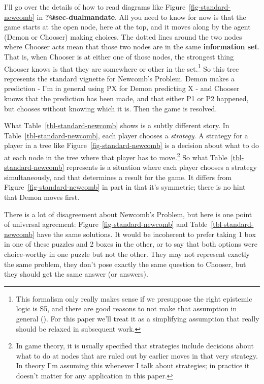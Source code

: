 \documentclass[
  10pt,
  letterpaper,
  DIV=11,
  numbers=noendperiod,
  twoside]{scrartcl}
\begin{document}
I'll go over the details of how to read diagrams like
Figure~\ref{fig-standard-newcomb} in \textbf{?@sec-dualmandate}. All you
need to know for now is that the game starts at the open node, here at
the top, and it moves along by the agent (Demon or Chooser) making
choices. The dotted lines around the two nodes where Chooser acts mean
that those two nodes are in the same \textbf{information set}. That is,
when Chooser is at either one of those nodes, the strongest thing
Chooser knows is that they are somewhere or other in the set.\footnote{This
  formalism only really makes sense if we presuppose the right epistemic
  logic is S5, and there are good reasons to not make that assumption in
  general ().
  For this paper we'll treat it as a simplifying assumption that really
  should be relaxed in subsequent work.} So this tree represents the
standard vignette for Newcomb's Problem. Demon makes a prediction - I'm
in general using PX for Demon predicting X - and Chooser knows that the
prediction has been made, and that either P1 or P2 happened, but chooses
without knowing which it is. Then the game is resolved.

What Table~\ref{tbl-standard-newcomb} shows is a subtly different story.
In Table~\ref{tbl-standard-newcomb}, each player chooses a
\emph{strategy}. A strategy for a player in a tree like
Figure~\ref{fig-standard-newcomb} is a decision about what to do at each
node in the tree where that player has to move.\footnote{In game theory,
  it is usually specified that strategies include decisions about what
  to do at nodes that are ruled out by earlier moves in that very
  strategy. In theory I'm assuming this whenever I talk about
  strategies; in practice it doesn't matter for any application in this
  paper.} So what Table~\ref{tbl-standard-newcomb} represents is a
situation where each player chooses a strategy simultaneously, and that
determines a result for the game. It differs from
Figure~\ref{fig-standard-newcomb} in part in that it's symmetric; there
is no hint that Demon moves first.

There is a lot of disagreement about Newcomb's Problem, but here is one
point of universal agreement: Figure~\ref{fig-standard-newcomb} and
Table~\ref{tbl-standard-newcomb} have the same solutions. It would be
incoherent to prefer taking 1 box in one of these puzzles and 2 boxes in
the other, or to say that both options were choice-worthy in one puzzle
but not the other. They may not represent exactly the same problem, they
don't pose exactly the same question to Chooser, but they should get the
same answer (or answers).
\end{document}
